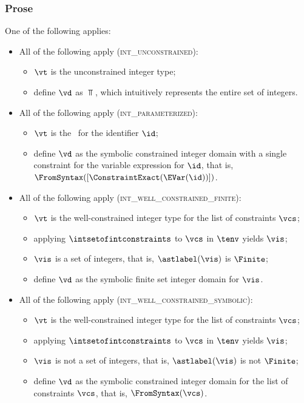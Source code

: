 \subsubsection{Prose}
One of the following applies:
\begin{itemize}
  \item All of the following apply (\textsc{int\_unconstrained}):
  \begin{itemize}
    \item $\vt$ is the unconstrained integer type;
    \item define $\vd$ as $\Top$, which intuitively represents the entire set of integers.
  \end{itemize}

  \item All of the following apply (\textsc{int\_parameterized}):
  \begin{itemize}
    \item $\vt$ is the \parameterizedintegertype\ for the identifier $\id$;
    \item define $\vd$ as the symbolic constrained integer domain with a single constraint for the variable expression for $\id$,
          that is, \\ $\FromSyntax([\ConstraintExact(\EVar(\id))])$.
  \end{itemize}

  \item All of the following apply (\textsc{int\_well\_constrained\_finite}):
  \begin{itemize}
    \item $\vt$ is the well-constrained integer type for the list of constraints $\vcs$;
    \item applying $\intsetofintconstraints$ to $\vcs$ in $\tenv$ yields $\vis$;
    \item $\vis$ is a set of integers, that is, $\astlabel(\vis)$ is $\Finite$;
    \item define $\vd$ as the symbolic finite set integer domain for $\vis$.
  \end{itemize}

  \item All of the following apply (\textsc{int\_well\_constrained\_symbolic}):
  \begin{itemize}
    \item $\vt$ is the well-constrained integer type for the list of constraints $\vcs$;
    \item applying $\intsetofintconstraints$ to $\vcs$ in $\tenv$ yields $\vis$;
    \item $\vis$ is not a set of integers, that is, $\astlabel(\vis)$ is not $\Finite$;
    \item define $\vd$ as the symbolic constrained integer domain for the list of constraints $\vcs$, that is, $\FromSyntax(\vcs)$.
  \end{itemize}


\end{itemize}
